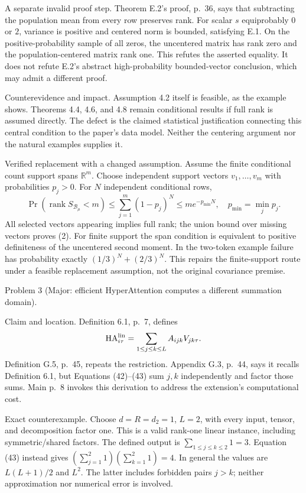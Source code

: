 \documentclass[10pt]{article}
\begin{document}
A separate invalid proof step. Theorem E.2’s proof, p. 36, says that subtracting the population mean from every row preserves rank. For scalar \(s\) equiprobably \(0\) or \(2\), variance is positive and centered norm is bounded, satisfying E.1. On the positive-probability sample of all zeros, the uncentered matrix has rank zero and the population-centered matrix rank one. This refutes the asserted equality. It does not refute E.2’s abstract high-probability bounded-vector conclusion, which may admit a different proof.\par
Counterevidence and impact. Assumption 4.2 itself is feasible, as the example shows. Theorems 4.4, 4.6, and 4.8 remain conditional results if full rank is assumed directly. The defect is the claimed statistical justification connecting this central condition to the paper’s data model. Neither the centering argument nor the natural examples supplies it.\par
Verified replacement with a changed assumption. Assume the finite conditional count support spans \(\mathbb R^m\). Choose independent support vectors \(v_1,\ldots,v_m\) with probabilities \(p_j>0\). For \(N\) independent conditional rows, \[\Pr(\operatorname{rank}S_{\mathcal B_\mu}<m)
 \le\sum_{j=1}^m(1-p_j)^N
 \le m e^{-p_{\min}N},\quad p_{\min}=\min_jp_j.
 \tag{2}\] All selected vectors appearing implies full rank; the union bound over missing vectors proves (2). For finite support the span condition is equivalent to positive definiteness of the uncentered second moment. In the two-token example failure has probability exactly \((1/3)^N+(2/3)^N\). This repairs the finite-support route under a feasible replacement assumption, not the original covariance premise.\par
Problem 3 (Major: efficient HyperAttention computes a different summation domain).\par
Claim and location. Definition 6.1, p. 7, defines \[\operatorname{HA}_{i\tau}^{\rm lin}
  =\sum_{1\le j\le k\le L}A_{ijk}V_{jk\tau}.\] Definition G.5, p. 45, repeats the restriction. Appendix G.3, p. 44, says it recalls Definition 6.1, but Equations (42)–(43) sum \(j,k\) independently and factor those sums. Main p. 8 invokes this derivation to address the extension’s computational cost.\par
Exact counterexample. Choose \(d=R=d_2=1\), \(L=2\), with every input, tensor, and decomposition factor one. This is a valid rank-one linear instance, including symmetric/shared factors. The defined output is \(\sum_{1\le j\le k\le2}1=3\). Equation (43) instead gives \((\sum_{j=1}^2 1)(\sum_{k=1}^2 1)=4\). In general the values are \(L(L+1)/2\) and \(L^2\). The latter includes forbidden pairs \(j>k\); neither approximation nor numerical error is involved.\par
\end{document}

